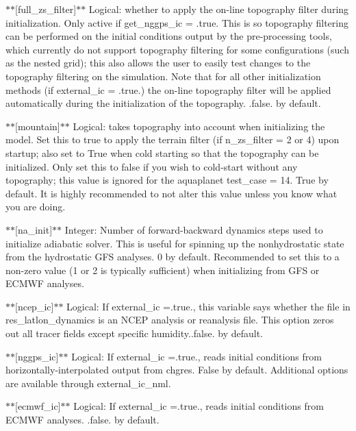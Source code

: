 $\ast$$\ast$\mbox{[}full\-\_\-zs\-\_\-filter\mbox{]}$\ast$$\ast$ Logical\-: whether to apply the on-\/line topography filter during initialization. Only active if get\-\_\-nggps\-\_\-ic = .true. This is so topography filtering can be performed on the initial conditions output by the pre-\/processing tools, which currently do not support topography filtering for some configurations (such as the nested grid); this also allows the user to easily test changes to the topography filtering on the simulation. Note that for all other initialization methods (if external\-\_\-ic = .true.) the on-\/line topography filter will be applied automatically during the initialization of the topography. .false. by default.

$\ast$$\ast$\mbox{[}mountain\mbox{]}$\ast$$\ast$ Logical\-: takes topography into account when initializing the model. Set this to true to apply the terrain filter (if n\-\_\-zs\-\_\-filter = 2 or 4) upon startup; also set to True when cold starting so that the topography can be initialized. Only set this to false if you wish to cold-\/start without any topography; this value is ignored for the aquaplanet test\-\_\-case = 14. True by default. It is highly recommended to not alter this value unless you know what you are doing.

$\ast$$\ast$\mbox{[}na\-\_\-init\mbox{]}$\ast$$\ast$ Integer\-: Number of forward-\/backward dynamics steps used to initialize adiabatic solver. This is useful for spinning up the nonhydrostatic state from the hydrostatic G\-F\-S analyses. 0 by default. Recommended to set this to a non-\/zero value (1 or 2 is typically sufficient) when initializing from G\-F\-S or E\-C\-M\-W\-F analyses.

$\ast$$\ast$\mbox{[}ncep\-\_\-ic\mbox{]}$\ast$$\ast$ Logical\-: If external\-\_\-ic =.true., this variable says whether the file in res\-\_\-latlon\-\_\-dynamics is an N\-C\-E\-P analysis or reanalysis file. This option zeros out all tracer fields except specific humidity..false. by default.

$\ast$$\ast$\mbox{[}nggps\-\_\-ic\mbox{]}$\ast$$\ast$ Logical\-: If external\-\_\-ic =.true., reads initial conditions from horizontally-\/interpolated output from chgres. False by default. Additional options are available through external\-\_\-ic\-\_\-nml.

$\ast$$\ast$\mbox{[}ecmwf\-\_\-ic\mbox{]}$\ast$$\ast$ Logical\-: If external\-\_\-ic =.true., reads initial conditions from E\-C\-M\-W\-F analyses. .false. by default.

